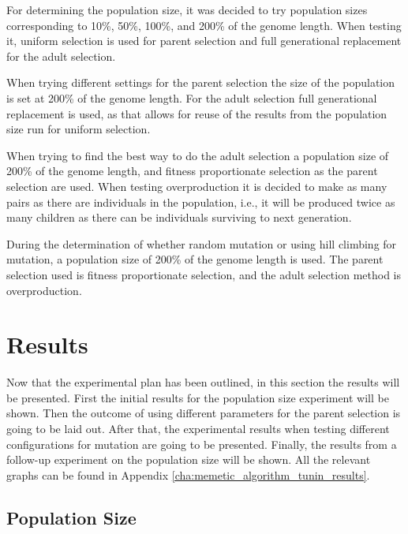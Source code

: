 For determining the population size, it was decided to try population sizes corresponding to 10\%, 50\%, 100\%, and 200\% of the genome length. When testing it, uniform selection is used for parent selection and full generational replacement for the adult selection.

When trying different settings for the parent selection the size of the population is set at 200\% of the genome length. For the adult selection full generational replacement is used, as that allows for reuse of the results from the population size run for uniform selection.

When trying to find the best way to do the adult selection a population size of 200\% of the genome length, and fitness proportionate selection as the parent selection are used. When testing overproduction it is decided to make as many pairs as there are individuals in the population, i.e., it will be produced twice as many children as there can be individuals surviving to next generation.

During the determination of whether random mutation or using hill climbing for mutation, a population size of 200\% of the genome length is used. The parent selection used is fitness proportionate selection, and the adult selection method is overproduction.



\section{Results} %
\label{sec:results}

Now that the experimental plan has been outlined, in this section the results will be presented. First the initial results for the population size experiment will be shown. Then the outcome of using different parameters for the parent selection is going to be laid out. After that, the experimental results when testing different configurations for mutation are going to be presented. Finally, the results from a follow-up experiment on the population size will be shown. All the relevant graphs can be found in Appendix \ref{cha:memetic_algorithm_tunin_results}.

\subsection{Population Size} %
\label{sub:population_size}

